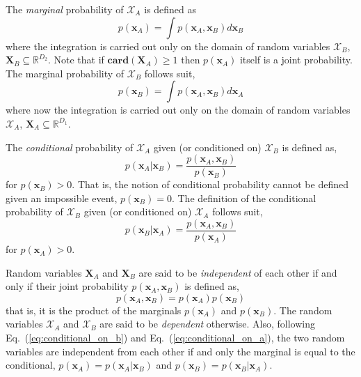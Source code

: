 The \emph{marginal} probability of $\bm{\mathcal{X}}_A$ is defined as
\begin{equation}
  p(\mathbf{x}_A) = \int p(\mathbf{x}_A,\mathbf{x}_B) d\mathbf{x}_B
\label{eq:marginal_set_a}
\end{equation}
where the integration is carried out only on the domain of random variables $\bm{\mathcal{X}}_B$, $\mathbf{X}_B \subseteq \mathbb{R}^{D_2}$. 
Note that if $\mathbf{card}(\mathbf{X}_A) \geq 1$ then $p(\mathbf{x}_A)$ itself is a joint probability.
The marginal probability of $\bm{\mathcal{X}}_B$ follows suit,
\begin{equation}
  p(\mathbf{x}_B) = \int p(\mathbf{x}_A,\mathbf{x}_B) d\mathbf{x}_A
\label{eq:marginal_set_b}
\end{equation}
where now the integration is carried out only on the domain of random variables $\bm{\mathcal{X}}_A$, $\mathbf{X}_A \subseteq \mathbb{R}^{D_1}$.

The \emph{conditional} probability of $\bm{\mathcal{X}}_A$ given (or conditioned on) $\bm{\mathcal{X}}_B$ is defined as,
\begin{equation}
  p(\mathbf{x}_A|\mathbf{x}_B) = \frac{p(\mathbf{x}_A, \mathbf{x}_B)}{p(\mathbf{x}_B)}
\label{eq:conditional_on_b}
\end{equation}
for $p(\mathbf{x}_B) > 0$. That is, the notion of conditional probability cannot be defined given an impossible event, $p(\mathbf{x}_B) = 0$. 
The definition of the conditional probability of $\bm{\mathcal{X}}_B$ given (or conditioned on) $\bm{\mathcal{X}}_A$ follows suit, 
\begin{equation}
  p(\mathbf{x}_B|\mathbf{x}_A) = \frac{p(\mathbf{x}_A, \mathbf{x}_B)}{p(\mathbf{x}_A)}
\label{eq:conditional_on_a}
\end{equation}
for $p(\mathbf{x}_A) > 0$.

Random variables $\mathbf{X}_A$ and $\mathbf{X}_B$ are said to be \emph{independent} of each
other if and only if their joint probability $p(\mathbf{x}_A, \mathbf{x}_B)$ is defined as,
\begin{equation}
  p(\mathbf{x}_A, \mathbf{x}_B) = p(\mathbf{x}_A) p(\mathbf{x}_B)
\label{eq:independence}
\end{equation}
that is, it is the product of the marginals $p(\mathbf{x}_A)$ and $p(\mathbf{x}_B)$.
The random variables $\bm{\mathcal{X}}_A$ and $\bm{\mathcal{X}}_B$ are said to be \emph{dependent} otherwise.
Also, following Eq.~(\ref{eq:conditional_on_b}) and Eq.~(\ref{eq:conditional_on_a}), the two random variables are independent from each other if and only the marginal is equal to the conditional, $p(\mathbf{x}_A) = p(\mathbf{x}_A|\mathbf{x}_B)$ and $p(\mathbf{x}_B) = p(\mathbf{x}_B|\mathbf{x}_A)$.

